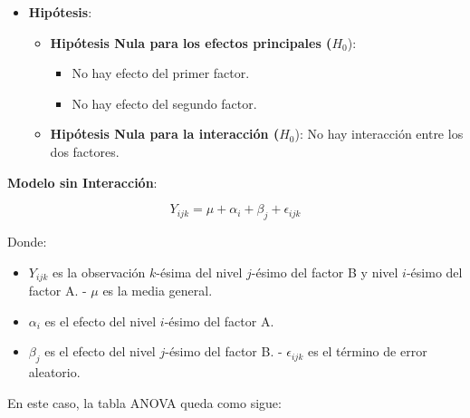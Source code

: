 \documentclass[
  letterpaper,
  DIV=11,
  numbers=noendperiod]{scrreprt}
\providecommand{\tightlist}{%
  \setlength{\itemsep}{0pt}\setlength{\parskip}{0pt}}\usepackage{longtable,booktabs,array}
\begin{document}
\begin{itemize}
\tightlist
\item
  \textbf{Hipótesis}:

  \begin{itemize}
  \tightlist
  \item
    \textbf{Hipótesis Nula para los efectos principales (}\(H_0\)):

    \begin{itemize}
    \tightlist
    \item
      No hay efecto del primer factor.
    \item
      No hay efecto del segundo factor.
    \end{itemize}
  \item
    \textbf{Hipótesis Nula para la interacción (}\(H_0\)): No hay
    interacción entre los dos factores.
  \end{itemize}
\end{itemize}

\textbf{Modelo sin Interacción}:

\[ Y_{ijk} = \mu + \alpha_i + \beta_j + \epsilon_{ijk} \]

Donde:

\begin{itemize}
\tightlist
\item
  \(Y_{ijk}\) es la observación \(k\)-ésima del nivel \(j\)-ésimo del
  factor B y nivel \(i\)-ésimo del factor A. - \(\mu\) es la media
  general.
\item
  \(\alpha_i\) es el efecto del nivel \(i\)-ésimo del factor A.
\item
  \(\beta_j\) es el efecto del nivel \(j\)-ésimo del factor B. -
  \(\epsilon_{ijk}\) es el término de error aleatorio.
\end{itemize}

En este caso, la tabla ANOVA queda como sigue:
\end{document}
